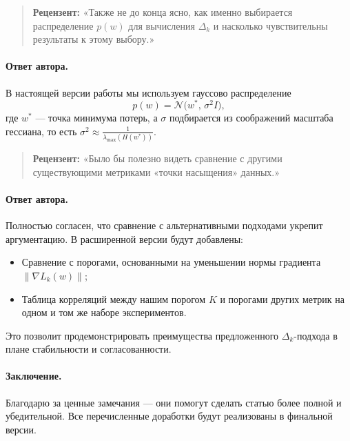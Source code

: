 \documentclass[11pt]{article}
\begin{document}
\begin{quote}
    \textbf{Рецензент:}
    «Также не до конца ясно, как именно выбирается распределение \(p(w)\) для вычисления \(\Delta_k\) и насколько чувствительны результаты к этому выбору.»
\end{quote}

\paragraph{Ответ автора.}
В настоящей версии работы мы используем гауссово распределение
\[
    p(w) = \mathcal{N}\bigl(w^*,\,\sigma^2 I\bigr),
\]
где \(w^*\) — точка минимума потерь, а \(\sigma\) подбирается из соображений масштаба гессиана, то есть \(\sigma^2 \approx \tfrac{1}{\lambda_{\max}(H(w^*))}\).
\begin{quote}
    \textbf{Рецензент:}
    «Было бы полезно видеть сравнение с другими существующими метриками «точки насыщения» данных.»
\end{quote}

\paragraph{Ответ автора.}
Полностью согласен, что сравнение с альтернативными подходами укрепит аргументацию. В расширенной версии будут добавлены:
\begin{itemize}
    \item Сравнение с порогами, основанными на уменьшении нормы градиента \(\|\nabla L_k(w)\|\);
    \item Таблица корреляций между нашим порогом \(K\) и порогами других метрик на одном и том же наборе экспериментов.
\end{itemize}
Это позволит продемонстрировать преимущества предложенного \(\Delta_k\)-подхода в плане стабильности и согласованности.

\paragraph{Заключение.}
Благодарю за ценные замечания — они помогут сделать статью более полной и убедительной. Все перечисленные доработки будут реализованы в финальной версии.
\end{document}
